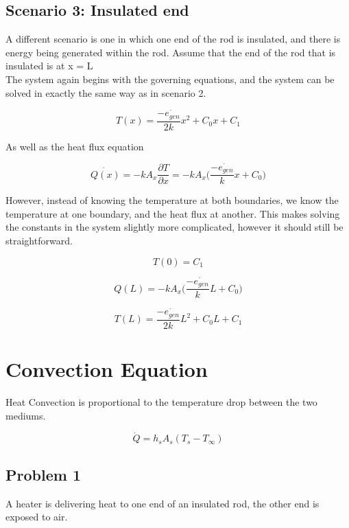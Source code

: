 \documentclass[•]{article}
\begin{document}
\subsection*{Scenario 3: Insulated end}
A different scenario is one in which one end of the rod is insulated, and there is energy being generated within the rod. Assume that the end of the rod that is insulated is at x = L\\

The system again begins with the governing equations, and the system can be solved in exactly the same way as in scenario 2. 

\begin{equation}
T(x) = \frac{-\dot{e_{gen}}}{2k}x^2 + C_0x + C_1
\end{equation}

As well as the heat flux equation

\begin{equation}
\dot{Q(x)} = -kA_x\frac{\partial T}{\partial x} = -kA_x{\Big(\frac{-\dot{e_{gen}}}{k}x+C_0\Big)}
\end{equation}

However, instead of knowing the temperature at both boundaries, we know the temperature at one boundary, and the heat flux at another. This makes solving the constants in the system slightly more complicated, however it should still be straightforward.

\begin{equation}
T(0) = C_1
\end{equation}

\begin{equation}
Q(L) = -kA_x\Big(\frac{-\dot{e_{gen}}}{k}L+C_0\Big)
\end{equation}

\begin{equation}
T(L) = \frac{-\dot{e_{gen}}}{2k}L^2 + C_0L + C_1
\end{equation}

\section*{Convection Equation}
Heat Convection is proportional to the temperature drop between the two mediums.

\begin{equation}
\dot{Q} = h_sA_s(T_s - T_{\infty})
\end{equation}

\subsection*{Problem 1}
A heater is delivering heat to one end of an insulated rod, the other end is exposed to air.\\
\end{document}
